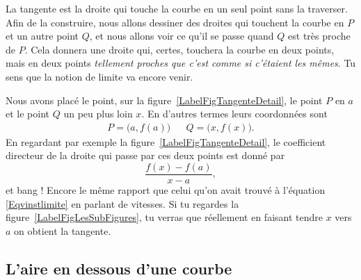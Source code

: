 La tangente est la droite qui touche la courbe en un seul point sans la traverser. Afin de la construire, nous allons dessiner des droites qui touchent la courbe en $P$ et un autre point $Q$, et nous allons voir ce qu'il se passe quand $Q$ est très proche de $P$. Cela donnera une droite qui, certes, touchera la courbe en deux points, mais en deux points \emph{tellement proches que c'est comme si c'étaient les mêmes}. Tu sens que la notion de limite va encore venir.

\newcommand{\CaptionFigTangenteDetail}{Traçons d'abord une corde entre le point $P$ et un point $Q$ un peu plus loin.}


Nous avons placé le point, sur la figure~\ref{LabelFigTangenteDetail}, le point $P$ en $a$ et le point $Q$ un peu plus loin $x$. En d'autres termes leurs coordonnées sont
\begin{align}
	P=\big(a,f(a)\big)&& Q=\big(x,f(x)\big).
\end{align}
En regardant par exemple la figure~\ref{LabelFigTangenteDetail}, le coefficient directeur de la droite qui passe par ces deux points est donné par
\begin{equation}
	\frac{ f(x)-f(a) }{ x-a },
\end{equation}
et bang ! Encore le même rapport que celui qu'on avait trouvé à l'équation \eqref{Eqvinstlimite} en parlant de vitesses. Si tu regardes la figure~\ref{LabelFigLesSubFigures}, tu verras que réellement en faisant tendre $x$ vers $a$ on obtient la tangente.

\newcommand{\CaptionFigLesSubFigures}{Recherche de la tangente par approximations successives.}


\subsection{L'aire en dessous d'une courbe}		\label{SubSecAirePrimInto}

